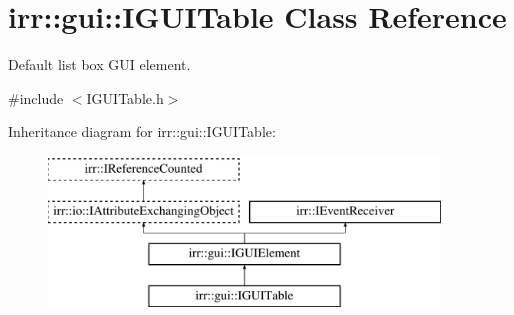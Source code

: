 \hypertarget{classirr_1_1gui_1_1IGUITable}{}\section{irr\+:\+:gui\+:\+:I\+G\+U\+I\+Table Class Reference}
\label{classirr_1_1gui_1_1IGUITable}


Default list box G\+UI element.  




{\ttfamily \#include $<$I\+G\+U\+I\+Table.\+h$>$}

Inheritance diagram for irr\+:\+:gui\+:\+:I\+G\+U\+I\+Table\+:\begin{figure}[H]
\begin{center}
\leavevmode
\includegraphics[height=4.000000cm]{classirr_1_1gui_1_1IGUITable}
\end{center}
\end{figure}
